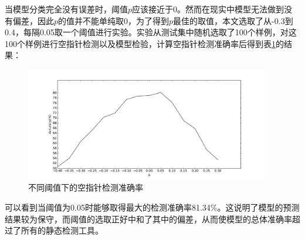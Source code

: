 当模型分类完全没有误差时，阈值$p$应该接近于0。然而在现实中模型无法做到没有偏差，因此$p$的值并不能单纯取0，为了得到$p$最佳的取值，本文选取了从-0.3到0.4，每隔0.05取一个阈值进行实验。实验从测试集中随机选取了100个样例，对这100个样例进行空指针检测以及模型检验，计算空指针检测准确率后得到表\ref{res}的结果：
\begin{figure}[ht]
	\begin{center}
		\includegraphics[width=0.95\textwidth]{figures//10.pdf}
		\caption{不同阈值下的空指针检测准确率}
		\label{res}
	\end{center}
\end{figure}

可以看到当阈值为0.05时能够取得最大的检测准确率81.34\%。这说明了模型的预测结果较为保守，而阈值的选取正好中和了其中的偏差，从而使模型的总体准确率超过了所有的静态检测工具。